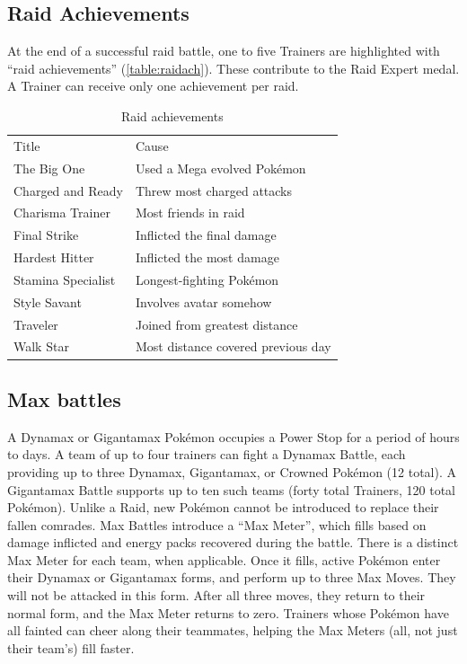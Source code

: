 \subsection{Raid Achievements}
\label{subsec:raidachievements}
At the end of a successful raid battle, one to five Trainers
 are highlighted with ``raid achievements'' (\autoref{table:raidach}).
These contribute to the Raid Expert medal.
A Trainer can receive only one achievement per raid.
\begin{table}
\centering
\begin{tabular}{ll}
Title & Cause\\
\Midrule
The Big One & Used a Mega evolved Pokémon\\
Charged and Ready & Threw most charged attacks\\
Charisma Trainer & Most friends in raid\\
Final Strike & Inflicted the final damage\\
Hardest Hitter & Inflicted the most damage\\
Stamina Specialist & Longest-fighting Pokémon\\
Style Savant & Involves avatar somehow\\
Traveler & Joined from greatest distance\\
Walk Star & Most distance covered previous day\\
\end{tabular}
\caption{Raid achievements}
\label{table:raidach}
\end{table}

\subsection{Max battles}
\label{sec:maxbattles}
A Dynamax or Gigantamax Pokémon occupies a Power Stop for a period of hours to days.
A team of up to four trainers can fight a Dynamax Battle, each providing up to
  three Dynamax, Gigantamax, or Crowned Pokémon (12 total).
A Gigantamax Battle supports up to ten such teams (forty total Trainers, 120 total Pokémon).
Unlike a Raid, new Pokémon cannot be introduced to replace their fallen comrades.
Max Battles introduce a ``Max Meter'', which fills based on damage inflicted and
  energy packs recovered during the battle.
There is a distinct Max Meter for each team, when applicable.
Once it fills, active Pokémon enter their Dynamax or Gigantamax forms, and perform
  up to three Max Moves.
They will not be attacked in this form.
After all three moves, they return to their normal form, and the Max Meter returns to zero.
Trainers whose Pokémon have all fainted can cheer along their teammates,
  helping the Max Meters (all, not just their team's) fill faster.

